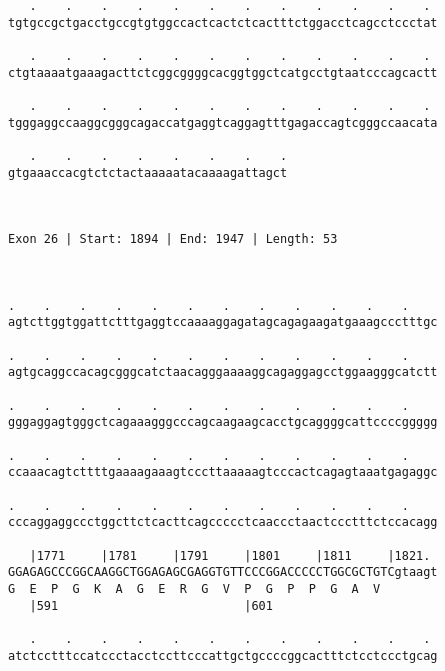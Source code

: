 \documentclass{article}
\begin{document}
\begin{Verbatim}
   .    .    .    .    .    .    .    .    .    .    .    . 
tgtgccgctgacctgccgtgtggccactcactctcactttctggacctcagcctccctat
                                                            
   .    .    .    .    .    .    .    .    .    .    .    . 
ctgtaaaatgaaagacttctcggcggggcacggtggctcatgcctgtaatcccagcactt
                                                            
   .    .    .    .    .    .    .    .    .    .    .    . 
tgggaggccaaggcgggcagaccatgaggtcaggagtttgagaccagtcgggccaacata
                                                            
   .    .    .    .    .    .    .    .
gtgaaaccacgtctctactaaaaatacaaaagattagct
                                       
                                       
 
Exon 26 | Start: 1894 | End: 1947 | Length: 53



.    .    .    .    .    .    .    .    .    .    .    .    
agtcttggtggattctttgaggtccaaaaggagatagcagagaagatgaaagccctttgc
                                                            
.    .    .    .    .    .    .    .    .    .    .    .    
agtgcaggccacagcgggcatctaacagggaaaaggcagaggagcctggaagggcatctt
                                                            
.    .    .    .    .    .    .    .    .    .    .    .    
gggaggagtgggctcagaaagggcccagcaagaagcacctgcaggggcattccccggggg
                                                            
.    .    .    .    .    .    .    .    .    .    .    .    
ccaaacagtcttttgaaaagaaagtcccttaaaaagtcccactcagagtaaatgagaggc
                                                            
.    .    .    .    .    .    .    .    .    .    .    .    
cccaggaggccctggcttctcacttcagccccctcaaccctaactccctttctccacagg
                                                            
   |1771     |1781     |1791     |1801     |1811     |1821. 
GGAGAGCCCGGCAAGGCTGGAGAGCGAGGTGTTCCCGGACCCCCTGGCGCTGTCgtaagt
G  E  P  G  K  A  G  E  R  G  V  P  G  P  P  G  A  V        
   |591                          |601                       
  
   .    .    .    .    .    .    .    .    .    .    .    . 
atctcctttccatccctacctccttcccattgctgccccggcactttctcctccctgcag
                                                            

\end{Verbatim}
\end{document}
